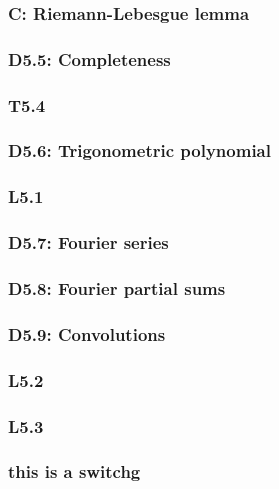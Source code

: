 \documentclass{article}
\begin{document}
\begin{multicols*}{3}
\subsubsection*{C: Riemann-Lebesgue lemma}

\subsubsection*{D5.5: Completeness}

\subsubsection*{T5.4}

\subsubsection*{D5.6: Trigonometric polynomial}

\subsubsection*{L5.1}

\subsubsection*{D5.7: Fourier series}

\subsubsection*{D5.8: Fourier partial sums}

\subsubsection*{D5.9: Convolutions}

\subsubsection*{L5.2}

\subsubsection*{L5.3}

\subsubsection*{this is a switchg}

\end{multicols*}
\end{document}
